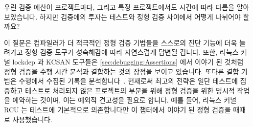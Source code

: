 \iffalse

Subsequent bars in \cref{fig:formal:Linux-Kernel RCU Test Code} show
that the RCU code base expanded significantly, but that the
corresponding validation code expanded even more dramatically.
Linux kernel v3.5 added tests for the \co{rcu_barrier()} API, closing
a long-standing hole in test coverage.
Linux kernel v3.14 added automated testing and analysis of test results,
moving RCU towards continuous integration.
Linux kernel v4.7 added a performance validation suite for RCU's update-side
primitives.
Linux kernel v4.12 added Tree SRCU, featuring improved update-side
scalability, and v4.13 removed the old less-scalable SRCU implementation.
Linux kernel v5.0 briefly hosted the \path{nolibc} library within
the rcutorture scripting directory before it moved to its long-term
home in \path{tools/include/nolibc}.
Linux kernel v5.8 added the Tasks Trace and Rude flavors of RCU\@.
Linux kernel v5.9 added the \path{refscale.c} suite of read-side performance
tests.
Numerous other changes may be found in the Linux kernel's \co{git} archives.

\fi

우린 검증 예산이 프로젝트마다, 그리고 특정 프로젝트에서도 시간에 따라 다름을
알아보았습니다.
하지만 검증에의 투자는 테스트와 정형 검증 사이에서 어떻게 나뉘어야 할까요?

이 질문은 컴파일러가 더 적극적인 정형 검증 기법들을 스스로의 진단 기능에 더욱
늘려가고 정형 검증 도구가 성숙해감에 따라 자연스럽게 답변될 겁니다.  또한,
리눅스 커널 lockdep 과 KCSAN 도구들은 \cref{sec:debugging:Assertions} 에서
이야기 된 것처럼 정형 검증을 수행 시간 분석과 결합하는 것의 장점을 보이고
있습니다.
또다른 결합 기법은 수행에서 수집된 기록을
분석합니다~\cite{DanielBristot2019RTtrace}.
현재로써 최고의 전략은 일단 테스트에 집중하고 테스트로 처리되지 않은 프로젝트의
부분을 위해 정형 검증을 위한 명시적 작업을 예약하는 것이며, 이는 예외적
견고성을 필요로 합니다.
예를 들어, 리눅스 커널 RCU 는 테스트에 기본적으로 의존합니다만 이 챕터에서
이야기 된 정형 검증을 때때로 사용했습니다.

